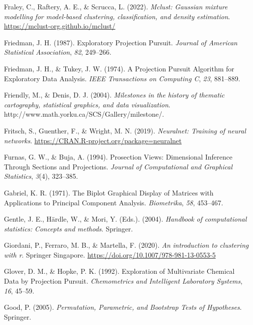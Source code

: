 \documentclass[
  letterpaper,
]{krantz}
\newlength{\cslhangindent}
\newenvironment{CSLReferences}[2] %
 {\begin{list}{}{%
  \setlength{\itemindent}{0pt}
  \setlength{\leftmargin}{0pt}
  \setlength{\parsep}{0pt}
  \ifodd #1
   \setlength{\leftmargin}{\cslhangindent}
   \setlength{\itemindent}{-1\cslhangindent}
  \fi
  \setlength{\itemsep}{#2\baselineskip}}}
 {\end{list}}
\begin{document}
\begin{CSLReferences}{1}{0}
Fraley, C., Raftery, A. E., \& Scrucca, L. (2022). \emph{Mclust:
Gaussian mixture modelling for model-based clustering, classification,
and density estimation}. \url{https://mclust-org.github.io/mclust/}

Friedman, J. H. (1987). {E}xploratory {P}rojection {P}ursuit.
\emph{Journal of American Statistical Association}, \emph{82}, 249--266.

Friedman, J. H., \& Tukey, J. W. (1974). {A} {P}rojection {P}ursuit
{A}lgorithm for {E}xploratory {D}ata {A}nalysis. \emph{IEEE Transactions
on Computing C}, \emph{23}, 881--889.

Friendly, M., \& Denis, D. J. (2004). \emph{Milestones in the history of
thematic cartography, statistical graphics, and data visualization}.
http://www.math.yorku.ca/SCS/Gallery/milestone/.

Fritsch, S., Guenther, F., \& Wright, M. N. (2019). \emph{Neuralnet:
Training of neural networks}.
\url{https://CRAN.R-project.org/package=neuralnet}

Furnas, G. W., \& Buja, A. (1994). Prosection {V}iews: {D}imensional
{I}nference {T}hrough {S}ections and {P}rojections. \emph{Journal of
Computational and Graphical Statistics}, \emph{3}(4), 323--385.

Gabriel, K. R. (1971). The {B}iplot {G}raphical {D}isplay of {M}atrices
with {A}pplications to {P}rincipal {C}omponent {A}nalysis.
\emph{Biometrika}, \emph{58}, 453--467.

Gentle, J. E., Härdle, W., \& Mori, Y. (Eds.). (2004). \emph{Handbook of
computational statistics: Concepts and methods}. Springer.

Giordani, P., Ferraro, M. B., \& Martella, F. (2020). \emph{An
introduction to clustering with r}. Springer Singapore.
\url{https://doi.org/10.1007/978-981-13-0553-5}

Glover, D. M., \& Hopke, P. K. (1992). {E}xploration of {M}ultivariate
{C}hemical {D}ata by {P}rojection {P}ursuit. \emph{Chemometrics and
Intelligent Laboratory Systems}, \emph{16}, 45--59.

Good, P. (2005). \emph{Permutation, {P}arametric, and {B}ootstrap
{T}ests of {H}ypotheses}. Springer.


\end{CSLReferences}
\end{document}
